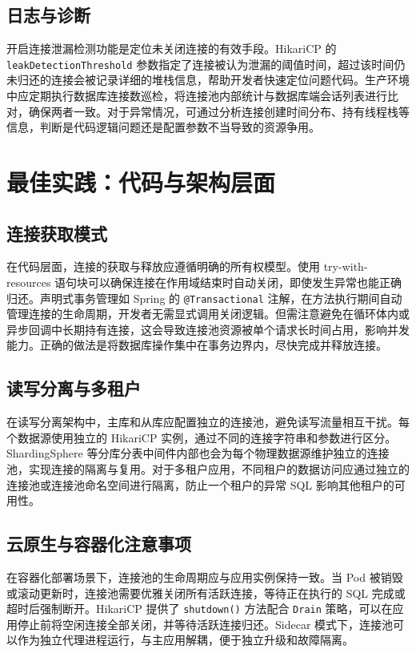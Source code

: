 \section{日志与诊断}
开启连接泄漏检测功能是定位未关闭连接的有效手段。HikariCP 的 \texttt{leakDetectionThreshold} 参数指定了连接被认为泄漏的阈值时间，超过该时间仍未归还的连接会被记录详细的堆栈信息，帮助开发者快速定位问题代码。生产环境中应定期执行数据库连接数巡检，将连接池内部统计与数据库端会话列表进行比对，确保两者一致。对于异常情况，可通过分析连接创建时间分布、持有线程栈等信息，判断是代码逻辑问题还是配置参数不当导致的资源争用。\par
\chapter{最佳实践：代码与架构层面}
\section{连接获取模式}
在代码层面，连接的获取与释放应遵循明确的所有权模型。使用 try-with-resources 语句块可以确保连接在作用域结束时自动关闭，即使发生异常也能正确归还。声明式事务管理如 Spring 的 \texttt{@Transactional} 注解，在方法执行期间自动管理连接的生命周期，开发者无需显式调用关闭逻辑。但需注意避免在循环体内或异步回调中长期持有连接，这会导致连接池资源被单个请求长时间占用，影响并发能力。正确的做法是将数据库操作集中在事务边界内，尽快完成并释放连接。\par
\section{读写分离与多租户}
在读写分离架构中，主库和从库应配置独立的连接池，避免读写流量相互干扰。每个数据源使用独立的 HikariCP 实例，通过不同的连接字符串和参数进行区分。ShardingSphere 等分库分表中间件内部也会为每个物理数据源维护独立的连接池，实现连接的隔离与复用。对于多租户应用，不同租户的数据访问应通过独立的连接池或连接池命名空间进行隔离，防止一个租户的异常 SQL 影响其他租户的可用性。\par
\section{云原生与容器化注意事项}
在容器化部署场景下，连接池的生命周期应与应用实例保持一致。当 Pod 被销毁或滚动更新时，连接池需要优雅关闭所有活跃连接，等待正在执行的 SQL 完成或超时后强制断开。HikariCP 提供了 \texttt{shutdown()} 方法配合 \texttt{Drain} 策略，可以在应用停止前将空闲连接全部关闭，并等待活跃连接归还。Sidecar 模式下，连接池可以作为独立代理进程运行，与主应用解耦，便于独立升级和故障隔离。\par
